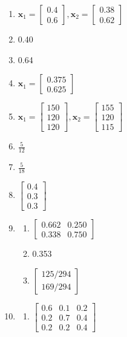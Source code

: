 \documentclass{article}
\newcommand{\vx}{\mathbf{x}}
\begin{document}
\begin{enumerate}
	\item $\vx_1=\begin{bmatrix}0.4\\0.6\end{bmatrix},
		      \vx_2=\begin{bmatrix}0.38\\0.62\end{bmatrix}$
	\item 0.40
	\item 0.64
	\item $\vx_1=\begin{bmatrix}0.375\\0.625\end{bmatrix}$
	\item $\vx_1=\begin{bmatrix}150\\120\\120\end{bmatrix},
		      \vx_2=\begin{bmatrix}155\\120\\115\end{bmatrix}$
	\item $\frac{5}{12}$
	\item $\frac{5}{18}$
	\item $\begin{bmatrix}0.4\\0.3\\0.3\end{bmatrix}$
	\item \begin{enumerate}
		      \item $\begin{bmatrix}0.662&0.250\\0.338&0.750\end{bmatrix}$
		      \item 0.353
		      \item $\begin{bmatrix}125/294\\169/294\end{bmatrix}$
	      \end{enumerate}
	\item \begin{enumerate}
		      \item $\begin{bmatrix}0.6&0.1&0.2\\0.2&0.7&0.4\\0.2&0.2&0.4\end{bmatrix}$

\end{enumerate}
\end{enumerate}
\end{document}
